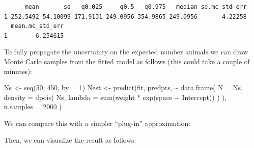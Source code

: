 \documentclass[
  letterpaper,
  DIV=11,
  numbers=noendperiod]{scrartcl}
\newenvironment{Shaded}{\begin{snugshade}}{\end{snugshade}}
\newcommand{\AttributeTok}[1]{\textcolor[rgb]{0.40,0.45,0.13}{#1}}
\newcommand{\DecValTok}[1]{\textcolor[rgb]{0.68,0.00,0.00}{#1}}
\newcommand{\FunctionTok}[1]{\textcolor[rgb]{0.28,0.35,0.67}{#1}}
\newcommand{\NormalTok}[1]{\textcolor[rgb]{0.00,0.23,0.31}{#1}}
\newcommand{\OtherTok}[1]{\textcolor[rgb]{0.00,0.23,0.31}{#1}}
\newcommand{\SpecialCharTok}[1]{\textcolor[rgb]{0.37,0.37,0.37}{#1}}
\newcommand{\StringTok}[1]{\textcolor[rgb]{0.13,0.47,0.30}{#1}}
\begin{document}
\begin{verbatim}
      mean       sd   q0.025     q0.5   q0.975   median sd.mc_std_err
1 252.5492 54.10099 171.9131 249.0956 354.9865 249.0956       4.22258
  mean.mc_std_err
1        6.254615
\end{verbatim}

To fully propagate the uncertainty on the expected number animals we can
draw Monte Carlo samples from the fitted model as follows (this could
take a couple of minutes):

\begin{Shaded}
\begin{Highlighting}[]
\NormalTok{Ns }\OtherTok{\textless{}{-}} \FunctionTok{seq}\NormalTok{(}\DecValTok{50}\NormalTok{, }\DecValTok{450}\NormalTok{, }\AttributeTok{by =} \DecValTok{1}\NormalTok{)}
\NormalTok{Nest }\OtherTok{\textless{}{-}} \FunctionTok{predict}\NormalTok{(fit, predpts,}
  \SpecialCharTok{\textasciitilde{}} \FunctionTok{data.frame}\NormalTok{(}
    \AttributeTok{N =}\NormalTok{ Ns,}
    \AttributeTok{density =} \FunctionTok{dpois}\NormalTok{(}
\NormalTok{      Ns,}
      \AttributeTok{lambda =} \FunctionTok{sum}\NormalTok{(weight }\SpecialCharTok{*} \FunctionTok{exp}\NormalTok{(space }\SpecialCharTok{+}\NormalTok{ Intercept))}
\NormalTok{    )}
\NormalTok{  ),}
  \AttributeTok{n.samples =} \DecValTok{2000}
\NormalTok{)}
\end{Highlighting}
\end{Shaded}

We can compare this with a simpler ``plug-in'' approximation:

\begin{Shaded}
\end{Shaded}

Then, we can visualize the result as follows:
\end{document}
